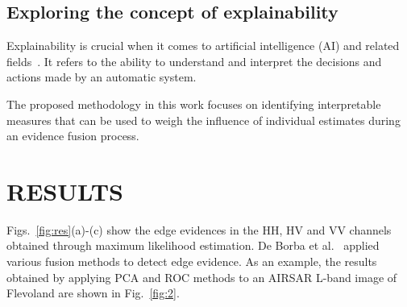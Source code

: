 \documentclass{article}
\begin{document}
\subsection{Exploring the concept of explainability}

Explainability is crucial when it comes to artificial intelligence (AI) and related fields~\cite{Vilone2021}. 
It refers to the ability to understand and interpret the decisions and actions made by an automatic system. 

The proposed methodology in this work focuses on identifying interpretable measures that can be used to weigh the influence of individual estimates during an evidence fusion process.

\section{RESULTS}

Figs.~\ref{fig:res}(a)-(c) show the edge evidences in the HH, HV and VV channels obtained through maximum likelihood estimation.
De Borba et al.~\cite{DeBorba2020} applied various fusion methods to detect edge evidence. 
As an example, the results obtained by applying PCA and ROC methods to an AIRSAR L-band image of Flevoland are shown in Fig.~\ref{fig:2}.%
\end{document}
